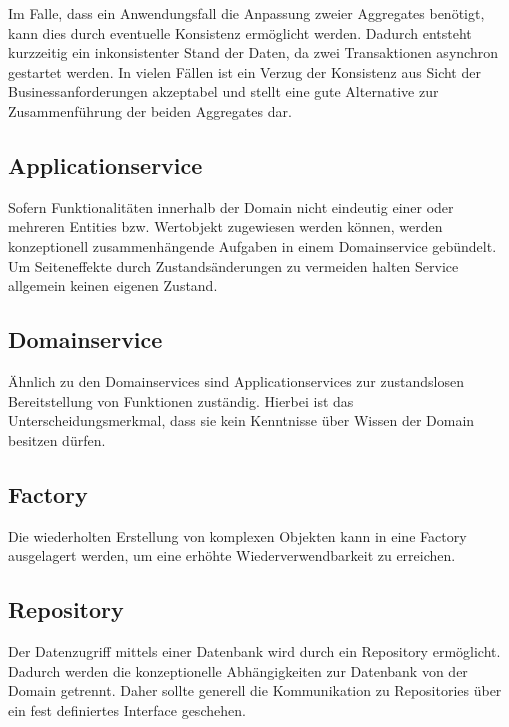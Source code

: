 
Im Falle, dass ein Anwendungsfall die Anpassung zweier Aggregates benötigt, kann dies durch eventuelle Konsistenz ermöglicht werden. Dadurch entsteht kurzzeitig ein inkonsistenter Stand der Daten, da zwei Transaktionen asynchron gestartet werden. In vielen Fällen ist ein Verzug der Konsistenz aus Sicht der Businessanforderungen akzeptabel und stellt eine gute Alternative zur Zusammenführung der beiden Aggregates dar.





\subsection{Applicationservice}

Sofern Funktionalitäten innerhalb der Domain nicht eindeutig einer oder mehreren Entities bzw. Wertobjekt zugewiesen werden können, werden konzeptionell zusammenhängende Aufgaben in einem Domainservice gebündelt. Um Seiteneffekte durch Zustandsänderungen zu vermeiden halten Service allgemein keinen eigenen Zustand.

\subsection{Domainservice}

Ähnlich zu den Domainservices sind Applicationservices zur zustandslosen Bereitstellung von Funktionen zuständig. Hierbei ist das Unterscheidungsmerkmal, dass sie kein Kenntnisse über Wissen der Domain besitzen dürfen.

\subsection{Factory}

Die wiederholten Erstellung von komplexen Objekten kann in eine Factory ausgelagert werden, um eine erhöhte Wiederverwendbarkeit zu erreichen.

\subsection{Repository}

Der Datenzugriff mittels einer Datenbank wird durch ein Repository ermöglicht. Dadurch werden die konzeptionelle Abhängigkeiten zur Datenbank von der Domain getrennt. Daher sollte generell die Kommunikation zu Repositories über ein fest definiertes Interface geschehen.

